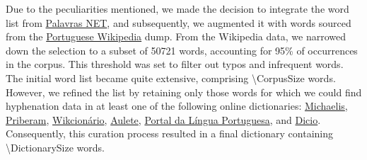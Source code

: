 

Due to the peculiarities mentioned, we made the decision to integrate the word
list from \href{https://www.palavras.net/}{Palavras NET}, and subsequently, we
augmented it with words sourced from the
\href{https://pt.wikipedia.org}{Portuguese Wikipedia} dump. From the Wikipedia
data, we narrowed down the selection to a subset of \num{50721} words,
accounting for 95\% of occurrences in the corpus. This threshold was set to
filter out typos and infrequent words. The initial word list became quite
extensive, comprising \num{\CorpusSize} words. However, we refined the list by
retaining only those words for which we could find hyphenation data in at least
one of the following online dictionaries:
\href{https://michaelis.uol.com.br/}{Michaelis},
\href{https://dicionario.priberam.org/}{Priberam},
\href{https://pt.wiktionary.org}{Wikcionário},
\href{https://aulete.com.br/}{Aulete},
\href{http://www.portaldalinguaportuguesa.org/}{Portal da Língua Portuguesa}, and
\href{https://www.dicio.com.br/}{Dicio}.
Consequently, this curation process resulted in a final dictionary containing
\num{\DictionarySize} words.  

